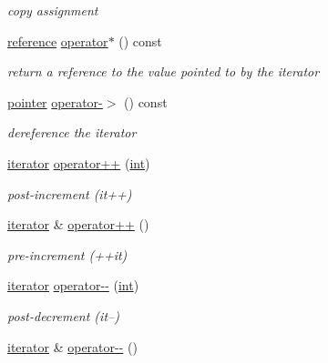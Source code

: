 \begin{DoxyCompactItemize}
\begin{DoxyCompactList}\small\item\em copy assignment \end{DoxyCompactList}\item 
\hyperlink{classnlohmann_1_1basic__json_1_1const__iterator_aefd248cac6493eed1e6ff53ba6a63eb2}{reference} \hyperlink{classnlohmann_1_1basic__json_1_1iterator_acbd82115f9232c3d3b5dacc78315b9da}{operator$\ast$} () const 
\begin{DoxyCompactList}\small\item\em return a reference to the value pointed to by the iterator \end{DoxyCompactList}\item 
\hyperlink{classnlohmann_1_1basic__json_1_1const__iterator_a1da96fc3054d547e7706d3a2f073f389}{pointer} \hyperlink{classnlohmann_1_1basic__json_1_1iterator_a8de46badb5b2177c85c672a71bcca017}{operator-\/$>$} () const 
\begin{DoxyCompactList}\small\item\em dereference the iterator \end{DoxyCompactList}\item 
\hyperlink{classnlohmann_1_1basic__json_1_1iterator}{iterator} \hyperlink{classnlohmann_1_1basic__json_1_1iterator_a2943e49b3d88e6ee5793c5923ab2ede9}{operator++} (\hyperlink{tk_8h_a83f82f76e7fed06f4c49d2db94028a6d}{int})
\begin{DoxyCompactList}\small\item\em post-\/increment (it++) \end{DoxyCompactList}\item 
\hyperlink{classnlohmann_1_1basic__json_1_1iterator}{iterator} \& \hyperlink{classnlohmann_1_1basic__json_1_1iterator_a050b7fa21051ea57e5b0cc03668b5d4a}{operator++} ()
\begin{DoxyCompactList}\small\item\em pre-\/increment (++it) \end{DoxyCompactList}\item 
\hyperlink{classnlohmann_1_1basic__json_1_1iterator}{iterator} \hyperlink{classnlohmann_1_1basic__json_1_1iterator_ab4f238aa5fcf452b1884b748b0395b1f}{operator-\/-\/} (\hyperlink{tk_8h_a83f82f76e7fed06f4c49d2db94028a6d}{int})
\begin{DoxyCompactList}\small\item\em post-\/decrement (it--) \end{DoxyCompactList}\item 
\hyperlink{classnlohmann_1_1basic__json_1_1iterator}{iterator} \& \hyperlink{classnlohmann_1_1basic__json_1_1iterator_ab3679dc63b3a59edb98b1c2b96d8683c}{operator-\/-\/} ()

\end{DoxyCompactItemize}

